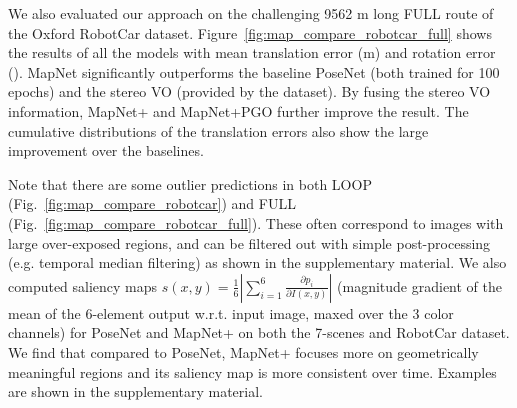 We also evaluated our approach on the challenging 9562 m long FULL route of the Oxford RobotCar
dataset. Figure~\ref{fig:map_compare_robotcar_full} shows the results of all the
models with mean translation error (m) and rotation error (\degree). 
MapNet significantly outperforms the baseline PoseNet (both trained for 100 epochs) and the stereo VO (provided by the dataset).
By fusing the stereo VO information, MapNet+ and MapNet+PGO further improve the result.
The cumulative distributions of the translation errors also show the large improvement over
the baselines. 

Note that there are some outlier predictions in both LOOP (Fig.~\ref{fig:map_compare_robotcar}) and FULL (Fig.~\ref{fig:map_compare_robotcar_full}).
These often correspond to images with large over-exposed regions, and can be filtered out with simple post-processing (e.g. temporal median filtering)
as shown in the supplementary material. We also computed saliency maps $s(x,y) = \frac{1}{6}|\sum_{i=1}^6 \frac{\partial p_i}{\partial I(x,y)}|$ (magnitude gradient of the mean of the 6-element output w.r.t. input image, maxed over the 3 color channels) for PoseNet
and MapNet+ on both the 7-scenes and RobotCar dataset. We find that compared to PoseNet, MapNet+ focuses more on geometrically meaningful regions
and its saliency map is more consistent over time. Examples are shown in the supplementary material.











